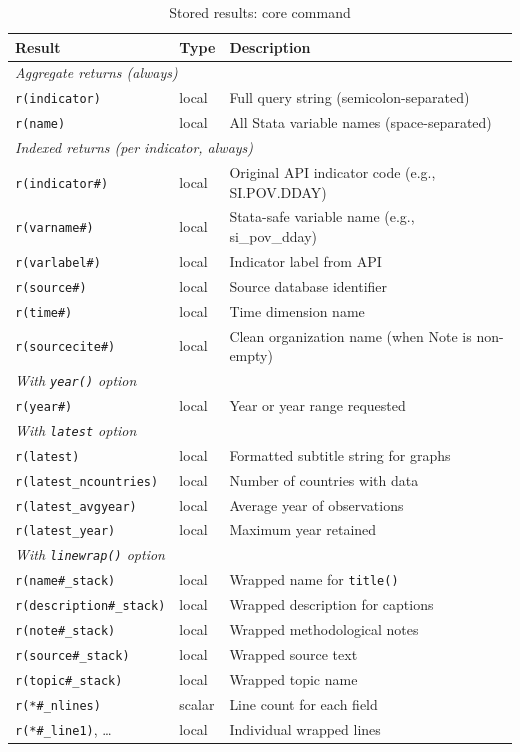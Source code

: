 \documentclass[bib]{statapress}
\begin{document}
\begin{table}[H]
\centering
\caption{Stored results: core command}
\label{tab:stored}
\begin{tabular}{llp{6.5cm}}
\hline
Result & Type & Description \\
\hline
\multicolumn{3}{l}{\textit{Aggregate returns (always)}} \\
\texttt{r(indicator)} & local & Full query string (semicolon-separated) \\
\texttt{r(name)} & local & All Stata variable names (space-separated) \\
\hline
\multicolumn{3}{l}{\textit{Indexed returns (per indicator, always)}} \\
\texttt{r(indicator\#)} & local & Original API indicator code (e.g., SI.POV.DDAY) \\
\texttt{r(varname\#)} & local & Stata-safe variable name (e.g., si\_pov\_dday) \\
\texttt{r(varlabel\#)} & local & Indicator label from API \\
\texttt{r(source\#)} & local & Source database identifier \\
\texttt{r(time\#)} & local & Time dimension name \\
\texttt{r(sourcecite\#)} & local & Clean organization name (when Note is non-empty) \\
\hline
\multicolumn{3}{l}{\textit{With \texttt{year()} option}} \\
\texttt{r(year\#)} & local & Year or year range requested \\
\hline
\multicolumn{3}{l}{\textit{With \texttt{latest} option}} \\
\texttt{r(latest)} & local & Formatted subtitle string for graphs \\
\texttt{r(latest\_ncountries)} & local & Number of countries with data \\
\texttt{r(latest\_avgyear)} & local & Average year of observations \\
\texttt{r(latest\_year)} & local & Maximum year retained \\
\hline
\multicolumn{3}{l}{\textit{With \texttt{linewrap()} option}} \\
\texttt{r(name\#\_stack)} & local & Wrapped name for \texttt{title()} \\
\texttt{r(description\#\_stack)} & local & Wrapped description for captions \\
\texttt{r(note\#\_stack)} & local & Wrapped methodological notes \\
\texttt{r(source\#\_stack)} & local & Wrapped source text \\
\texttt{r(topic\#\_stack)} & local & Wrapped topic name \\
\texttt{r(*\#\_nlines)} & scalar & Line count for each field \\
\texttt{r(*\#\_line1)}, \ldots & local & Individual wrapped lines \\
\hline
\end{tabular}
\end{table}
\end{document}
